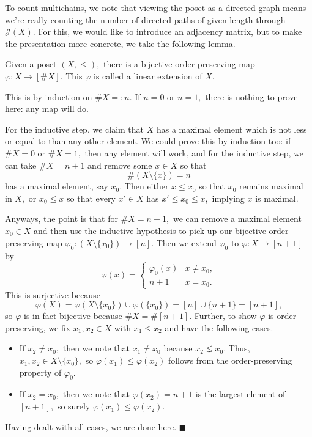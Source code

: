 To count multichains, we note that viewing the poset as a directed graph means we're really counting the number of directed paths of given length through $\mathcal J(X).$ For this, we would like to introduce an adjacency matrix, but to make the presentation more concrete, we take the following lemma.
\begin{lemma}
    Given a poset $(X,\le),$ there is a bijective order-preserving map $\varphi:X\to[\#X].$ This $\varphi$ is called a linear extension of $X.$
\end{lemma}
This is by induction on $\#X=:n.$ If $n=0$ or $n=1,$ there is nothing to prove here: any map will do.

For the inductive step, we claim that $X$ has a maximal element which is not less or equal to than any other element. We could prove this by induction too: if $\#X=0$ or $\#X=1,$ then any element will work, and for the inductive step, we can take $\#X=n+1$ and remove some $x\in X$ so that
\[\#(X\setminus\{x\})=n\]
has a maximal element, say $x_0.$ Then either $x\le x_0$ so that $x_0$ remains maximal in $X,$ or $x_0\le x$ so that every $x'\in X$ has $x'\le x_0\le x,$ implying $x$ is maximal.

Anyways, the point is that for $\#X=n+1,$ we can remove a maximal element $x_0\in X$ and then use the inductive hypothesis to pick up our bijective order-preserving map $\varphi_0:(X\setminus\{x_0\})\to[n].$ Then we extend $\varphi_0$ to $\varphi:X\to[n+1]$ by
\[\varphi(x)=\begin{cases}
    \varphi_0(x) & x\ne x_0, \\
    n+1 & x=x_0.
\end{cases}\]
This is surjective because
\[\varphi(X)=\varphi(X\setminus\{x_0\})\cup\varphi(\{x_0\})=[n]\cup\{n+1\}=[n+1],\]
so $\varphi$ is in fact bijective because $\#X=\#[n+1].$ Further, to show $\varphi$ is order-preserving, we fix $x_1,x_2\in X$ with $x_1\le x_2$ and have the following cases.
\begin{itemize}
    \item If $x_2\ne x_0,$ then we note that $x_1\ne x_0$ because $x_2\lneq x_0.$ Thus, $x_1,x_2\in X\setminus\{x_0\},$ so $\varphi(x_1)\le\varphi(x_2)$ follows from the order-preserving property of $\varphi_0.$
    \item If $x_2=x_0,$ then we note that $\varphi(x_2)=n+1$ is the largest element of $[n+1],$ so surely $\varphi(x_1)\le\varphi(x_2).$
\end{itemize}
Having dealt with all cases, we are done here. $\blacksquare$

